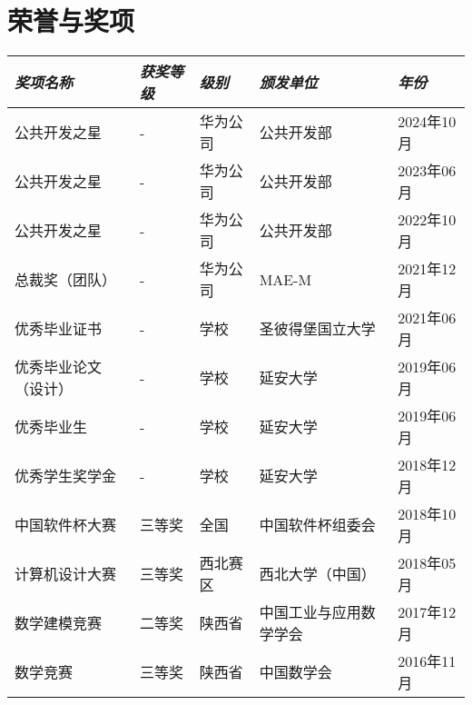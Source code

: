 \documentclass[letterpaper,10pt]{ctexart}
\makeatletter
\newcommand{\awardsTable}[1]{
	\begin{tabularx}{\textwidth}{l @{\extracolsep{\fill}} *{4}{l}}
	\emph{奖项名称}	& \emph{获奖等级}	& \emph{级别}	& \emph{颁发单位} & \emph{年份}       \\
	\midrule\midrule
	#1
	\end{tabularx}
}
\newcommand{\awardsTableRow}[6]{
	\BeginAccSupp{method=plain, ActualText=11\string\t 21}#1 & #2 & #3 & #4 & #5\EndAccSupp{} \\
}
\makeatother
\begin{document}
\section{荣誉与奖项}
\setlength{\tabcolsep}{6.0pt}
\renewcommand{\arraystretch}{1.1}
\fontsize{8.5}{11}\selectfont
\awardsTable{
  \awardsTableRow{公共开发之星}{-}{华为公司}{公共开发部}{2024年10月} \\
  \awardsTableRow{公共开发之星}{-}{华为公司}{公共开发部}{2023年06月} \\
  \awardsTableRow{公共开发之星}{-}{华为公司}{公共开发部}{2022年10月} \\
  \awardsTableRow{总裁奖（团队）}{-}{华为公司}{MAE-M}{2021年12月} \\
  \awardsTableRow{优秀毕业证书}{-}{学校}{圣彼得堡国立大学}{2021年06月} \\
  \awardsTableRow{优秀毕业论文（设计）}{-}{学校}{延安大学}{2019年06月} \\
  \awardsTableRow{优秀毕业生}{-}{学校}{延安大学}{2019年06月} \\
  \awardsTableRow{优秀学生奖学金}{-}{学校}{延安大学}{2018年12月} \\
  \awardsTableRow{中国软件杯大赛}{三等奖}{全国}{中国软件杯组委会}{2018年10月} \\
  \awardsTableRow{计算机设计大赛}{三等奖}{西北赛区}{西北大学（中国）}{2018年05月} \\
  \awardsTableRow{数学建模竞赛}{二等奖}{陕西省}{中国工业与应用数学学会}{2017年12月} \\
  \awardsTableRow{数学竞赛}{三等奖}{陕西省}{中国数学会}{2016年11月} \\ \hline }
\end{document}
